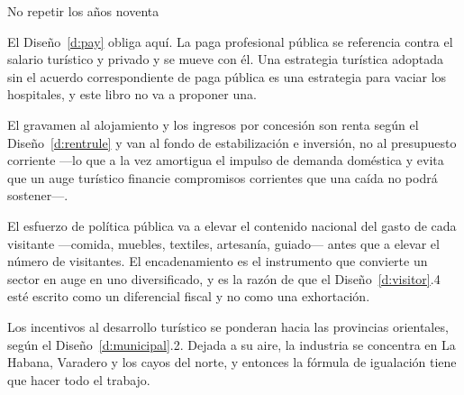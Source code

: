 \begin{design}{No repetir los años noventa}
\label{d:dutch}
\begin{rules}
 El Diseño~\ref{d:pay} obliga aquí. La paga profesional
pública se referencia contra el salario turístico y privado y se mueve con él. Una estrategia
turística adoptada sin el acuerdo correspondiente de paga pública es una estrategia para
vaciar los hospitales, y este libro no va a proponer una.

 El gravamen al alojamiento y los ingresos por concesión son
renta según el Diseño~\ref{d:rentrule} y van al fondo de estabilización e inversión, no al
presupuesto corriente ---lo que a la vez amortigua el impulso de demanda doméstica y evita
que un auge turístico financie compromisos corrientes que una caída no podrá sostener---.

 El esfuerzo de política pública va a elevar el
contenido nacional del gasto de cada visitante ---comida, muebles, textiles, artesanía,
guiado--- antes que a elevar el número de visitantes. El encadenamiento es el instrumento que
convierte un sector en auge en uno diversificado, y es la razón de que el
Diseño~\ref{d:visitor}.4 esté escrito como un diferencial fiscal y no como una exhortación.

 Los incentivos al desarrollo turístico se ponderan hacia las
provincias orientales, según el Diseño~\ref{d:municipal}.2. Dejada a su aire, la industria se
concentra en La Habana, Varadero y los cayos del norte, y entonces la fórmula de igualación
tiene que hacer todo el trabajo.
\end{rules}
\end{design}
